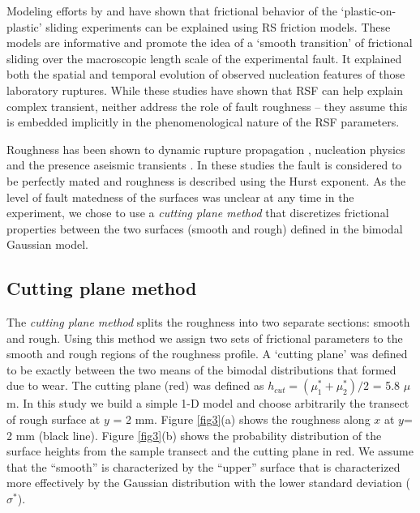 \documentclass[preprint,1p, 10pt,authoryear]{elsarticle}
\begin{document}
Modeling efforts by \citet{Kaneko2011} and \citet{Kaneko2016} have shown that frictional behavior of the `plastic-on-plastic' sliding experiments can be explained using RS friction models. These models are informative and promote the idea of a `smooth transition' of frictional sliding over the macroscopic length scale of the experimental fault. It explained both the spatial and temporal evolution of observed nucleation features of those laboratory ruptures. While these studies have shown that RSF can help explain complex transient, neither address the role of fault roughness -- they assume this is embedded implicitly in the phenomenological nature of the RSF parameters.

Roughness has been shown to dynamic rupture propagation \citep[e.g.][]{Dunham2011, Fang2013}, nucleation physics \citep[e.g.][]{Tal2018} and the presence aseismic transients \citep{Ozawa2019}. In these studies the fault is considered to be perfectly mated and roughness is described using the Hurst exponent. As the level of fault matedness of the surfaces was unclear at any time in the experiment, we chose to use a \textit{cutting plane method} that discretizes frictional properties between the two surfaces (smooth and rough) defined in the bimodal Gaussian model.

\subsection{Cutting plane method}
The \textit{cutting plane method} splits the roughness into two separate sections: smooth and rough. Using this method we assign two sets of frictional parameters to the smooth and rough regions of the roughness profile. A `cutting plane' was defined to be exactly between the two means of the bimodal distributions that formed due to wear. The cutting plane (red) was defined as $h_{cut} = \left(\mu^{*}_{1}+\mu^{*}_{2} \right)/2$ = 5.8 $\mu$m.  In this study we build a simple 1-D model and choose arbitrarily the transect of rough surface at $y$ = 2 mm. Figure \ref{fig3}(a) shows the roughness along $x$ at $y$= 2 mm (black line). Figure \ref{fig3}(b) shows the probability distribution of the surface heights from the sample transect and the cutting plane in red. We assume that the ``smooth'' is characterized by the ``upper'' surface that is characterized more effectively by the Gaussian distribution with the lower standard deviation ($\sigma^{*}$).
\end{document}
